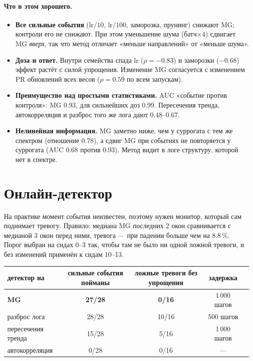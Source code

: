 \documentclass[10pt,a4paper]{article}
\newcommand{\good}[1]{\textcolor[HTML]{117733}{#1}}
\newcommand{\bad}[1]{\textcolor[HTML]{BB5566}{#1}}
\begin{document}
\paragraph{Что в этом хорошего.}
\begin{itemize}\setlength\itemsep{1pt}
\item \textbf{Все сильные события} (lr$/10$, lr$/100$, заморозка, прунинг) снижают MG;
  контроли его не снижают. При этом уменьшение шума (батч$\times4$) сдвигает MG
  \emph{вверх}, так что метод отличает «меньше направлений» от «меньше шума».
\item \textbf{Доза и ответ.} Внутри семейства спада lr ($\rho=-0.83$) и заморозки
  ($-0.68$) эффект растёт с силой упрощения. Изменение MG согласуется с изменением PR
  обновлений всех весов ($\rho=0.59$ по всем запускам).
\item \textbf{Преимущество над простыми статистиками.} AUC «событие против контроля»:
  MG 0.93, для сильнейших доз 0.99. Пересечения тренда, автокорреляция и разброс
  того же лога дают 0.48--0.67.
\item \textbf{Нелинейная информация.} MG заметно ниже, чем у суррогата с тем же
  спектром (отношение 0.78), а сдвиг MG при событиях не повторяется у суррогата
  (AUC 0.68 против 0.93). Метод видит в логе структуру, которой нет в спектре.
\end{itemize}

\section{Онлайн-детектор}

На практике момент события неизвестен, поэтому нужен монитор, который сам поднимает
тревогу. Правило: медиана MG последних 2 окон сравнивается с медианой 3 окон перед
ними, тревога --- при падении больше чем на 8.8\,\%. Порог выбран на сидах 0--3 так,
чтобы там не было ни одной ложной тревоги, и без изменений применён к сидам 10--13.

\begin{center}\small
\begin{tabular}{lcccc}\toprule
детектор на & сильные события пойманы & ложные тревоги без упрощения & задержка\\\midrule
\textbf{MG} & \good{\textbf{27/28}} & \good{\textbf{0/16}} & 1\,000 шагов\\
разброс лога & 28/28 & \bad{10/16} & 500 шагов\\
пересечения тренда & 15/28 & \bad{5/16} & 1\,000 шагов\\
автокорреляция & 0/28 & 0/16 & ---\\
\bottomrule\end{tabular}
\end{center}
\end{document}
